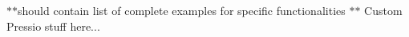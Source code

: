 $\ast$$\ast$should contain list of complete examples for specific functionalities $\ast$$\ast$ Custom Pressio stuff here... 